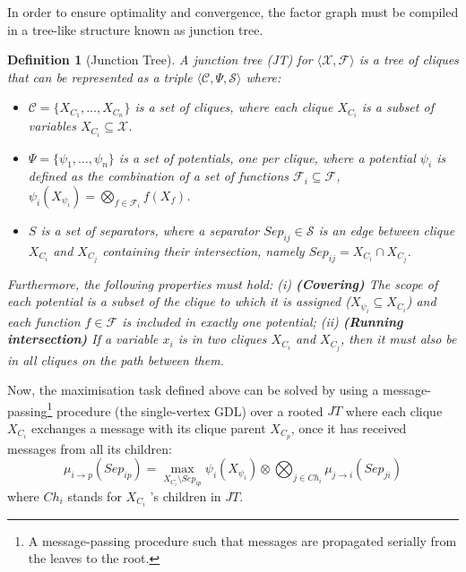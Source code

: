 \documentclass{aamas2012}
\newtheorem{definition}{Definition}
\begin{document}
 In order to ensure optimality and convergence, the factor graph must be
 compiled in a tree-like structure known as junction tree.
\begin{definition}[Junction Tree]
 A junction tree (JT) for $\langle \mathcal{X},\mathcal{F}\rangle$ is a
tree of cliques that can be represented as a triple $\langle 
\mathcal{C},\Psi,\mathcal{S}\rangle$ where:   
\begin{itemize}
\item $\mathcal{C}= \{X_{C_1},\ldots,X_{C_n}\}$ is a set of cliques, where each
clique $X_{C_i}$ is a subset of variables $X_{C_i}\subseteq \mathcal{X}$.
\item $\Psi=\{\psi_1,\ldots,\psi_n\}$ is a set of potentials, one per clique,
where a potential $\psi_i$ is defined as the combination of a set of 
 functions $\mathcal{F}_i\subseteq \mathcal{F}$, $\psi_i(X_{\psi_i}) =
 \bigotimes_{f\in \mathcal{F}_i} f(X_f)$. 
\item  $S$ is a set of separators,
where a separator $Sep_{ij}\in \mathcal{S}$ is an edge between clique $X_{C_i}$ and
$X_{C_j}$ containing their intersection, namely $Sep_{ij} = X_{C_i} \cap 
X_{C_j}$.
\end{itemize}
Furthermore, the following properties must hold: (i) {\bf (Covering)} The scope
of each potential is a subset of the clique to which it is assigned ($X_{\psi_i}
\subseteq X_{C_i}$) and each function $f\in \mathcal{F}$ is included in exactly one potential; (ii) {\bf (Running intersection)} If a variable $x_i$ is
in two cliques $X_{C_i}$ and $X_{C_j}$, then it must also be in all cliques on
the path between them.
\label{def:junctiontree}
\end{definition} 
\noindent Now, the maximisation task defined above can be solved by using a
message-passing\footnote{A message-passing procedure such that messages are
propagated serially from the leaves to the root.} procedure (the single-vertex
GDL) over a rooted $JT$ where
each clique $X_{C_i}$ exchanges a message with its
clique parent $X_{C_p}$, once it has received messages from
all its children:
\begin{equation}
\mu_{i \rightarrow p}(Sep_{ip}) = \max_{X_{C_i} \setminus Sep_{ip}}
\psi_i(X_{\psi_i}) \otimes \bigotimes_{j \in Ch_i} \mu_{j
\rightarrow i}(Sep_{ji})
\label{eq:gdl_message}
\end{equation}
where $Ch_i$ stands for $X_{C_i}$ 's children in $JT$.
\end{document}
